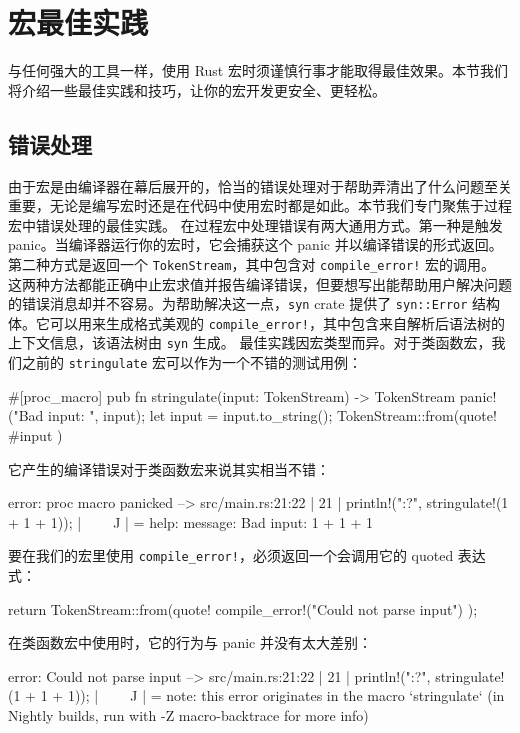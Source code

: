 \section{宏最佳实践}
\label{idx:idx_8f7df00e}
与任何强大的工具一样，使用 Rust 宏时须谨慎行事才能取得最佳效果。本节我们将介绍一些最佳实践和技巧，让你的宏开发更安全、更轻松。
\subsection{错误处理}
\label{idx:idx_0b817c93}
\label{idx:idx_7d991852}
由于宏是由编译器在幕后展开的，恰当的错误处理对于帮助弄清出了什么问题至关重要，无论是编写宏时还是在代码中使用宏时都是如此。本节我们专门聚焦于过程宏中错误处理的最佳实践。
在过程宏中处理错误有两大通用方式。第一种是触发 panic。当编译器运行你的宏时，它会捕获这个 panic 并以编译错误的形式返回。第二种方式是返回一个 \texttt{TokenStream}，其中包含对 \texttt{compile\_\allowbreak{}error!} 宏的调用。
\label{idx:idx_7827ded0}
\label{idx:idx_f5da390b}
这两种方法都能正确中止宏求值并报告编译错误，但要想写出能帮助用户解决问题的错误消息却并不容易。为帮助解决这一点，\texttt{syn} crate 提供了 \texttt{syn::Error} 结构体。它可以用来生成格式美观的 \texttt{compile\_\allowbreak{}error!}，其中包含来自解析后语法树的上下文信息，该语法树由
\texttt{syn} 生成。
最佳实践因宏类型而异。对于类函数宏，我们之前的 \texttt{stringulate} 宏可以作为一个不错的测试用例：
\begin{codebox}[rust]
#[proc_macro]
pub fn stringulate(input: TokenStream) -> TokenStream {
    panic!("Bad input: {}", input);
    let input = input.to_string();
    TokenStream::from(quote! {
        #input
    })
}
\end{codebox}
它产生的编译错误对于类函数宏来说其实相当不错：
\begin{codebox}[rust]
error: proc macro panicked
  --> src/main.rs:21:22
   |
21 |     println!("{:?}", stringulate!(1 + 1 + 1));
   |                      ^^^^^^^^^^^^^^^^^^^^^^^
   |
   = help: message: Bad input: 1 + 1 + 1
\end{codebox}
要在我们的宏里使用 \texttt{compile\_\allowbreak{}error!}，必须返回一个会调用它的 quoted 表达式：
\begin{codebox}[rust]
    return TokenStream::from(quote! {
        compile_error!("Could not parse input")
    });
\end{codebox}
在类函数宏中使用时，它的行为与 panic 并没有太大差别：
\begin{codebox}[rust]
error: Could not parse input
  --> src/main.rs:21:22
   |
21 |     println!("{:?}", stringulate!(1 + 1 + 1));
   |                      ^^^^^^^^^^^^^^^^^^^^^^^
   |
   = note: this error originates in the macro `stringulate` (in Nightly builds,
run with -Z macro-backtrace for more info)
\end{codebox}
